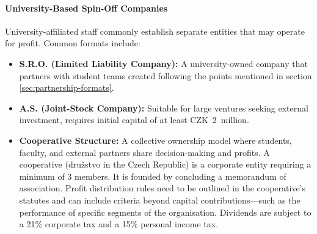 \paragraph{University-Based Spin-Off Companies}
University-affiliated staff commonly establish separate entities that may operate for profit. Common formats include:
\begin{itemize}
    \item \textbf{S.R.O. (Limited Liability Company):} A university-owned company that partners with student teams created following the points mentioned in section \ref{sec:partnership-formats}.
    \item \textbf{A.S. (Joint-Stock Company):} Suitable for large ventures seeking external investment, requires initial capital of at least CZK~2~million.
    \item \textbf{Cooperative Structure:} A collective ownership model where students, faculty, and external partners share decision-making and profits. A cooperative (družstvo in the Czech Republic) is a corporate entity requiring a minimum of 3 members. It is founded by concluding a memorandum of association. Profit distribution rules need to be outlined in the cooperative’s statutes and can include criteria beyond capital contributions---such as the performance of specific segments of the organisation. Dividends are subject to a 21\% corporate tax and a 15\% personal income tax.
\end{itemize}
